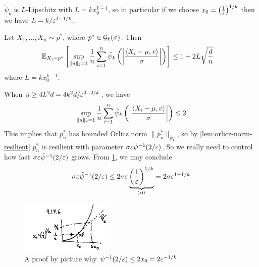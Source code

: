 $\tilde{\psi}_k$ is $L$-Lipschitz with $L = k x_0^{k-1}$, so in particular
if we choose $x_0 = \left(\frac{1}{\varepsilon}\right)^{1/k}$ then we have $L = k / \varepsilon^{1 - 1/k}$.

\begin{proposition}\label{prop:truncated-moments-bound}
  Let $X_1, \ldots, X_n \sim p^*$, where $p^* \in \mathcal{G}_k(\sigma)$. Then
  \begin{align}
    \mathbb{E}_{X_i \sim p^*}\left[
      \sup_{\|u\|_2 = 1} \frac{1}{n} \sum_{i=1}^n \tilde{\psi}_k\left(
        \left\lvert \frac{\braket{X_i - \mu, v}}{\sigma}\right\rvert
      \right)
    \right]
    &\leq 1 + 2 L \sqrt{\frac{d}{n}}
  \end{align}
  where $L = k x_0^{k-1}$.
\end{proposition}

\begin{remark}
  When  $n \geq 4 L^2 d = 4 k^2 d / \varepsilon^{2 - 2/k}$, we have
  \begin{align}
    \sup_{\|u\|_2 = 1} \frac{1}{n} \sum_{i=1}^n \tilde{\psi}_k\left(
      \left\lvert \frac{\braket{X_i - \mu, v}}{\sigma}\right\rvert
    \right)
    \leq 2
  \end{align}
  This implies that $p_n^*$ has bounded Orlicz norm
  $\|p_n^*\|_{\tilde{\psi}_k}$, so by \cref{lem:orlicz-norm-resilient}
  $p_n^*$ is resilient with parameter $\sigma \varepsilon \tilde{\psi}^{-1}(2/\varepsilon)$.
  So we really need to control how fast $\sigma \varepsilon \tilde{\psi}^{-1}(2/\varepsilon)$
  grows. From \cref{fig:bound-tilde-psi-k-inv}, we may conclude
  \begin{align}
    \sigma \varepsilon \tilde{\psi}^{-1}(2/\varepsilon)
    \leq 2 \sigma \varepsilon \underbrace{\left(\frac{1}{\varepsilon}\right)^{1/k}}_{> 0}
    = 2 \sigma \varepsilon^{1 - 1/k}
  \end{align}


  \begin{figure}[H]
    \begin{center}
      \includegraphics[width=0.4\textwidth]{figures/9-17-6.png}
    \end{center}
    \caption{A proof by picture why $\psi^{-1}(2/\varepsilon) \leq 2 x_0 = 2 \varepsilon^{-1/k}$}
    \label{fig:bound-tilde-psi-k-inv}
  \end{figure}

\end{remark}

